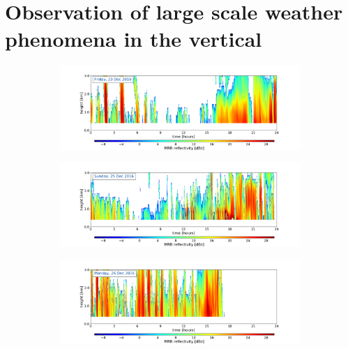 
\section{Observation of large scale weather phenomena in the vertical}
\begin{figure}[h!]
	\centering
    \begin{subfigure}[t]{\textwidth}
    \centering
    	\includegraphics[trim={4.cm 2.5cm 4.5cm 1.5cm},clip,width=\textwidth]{./fig_MRR_refl/MRR_20161223}
		\caption{}\label{fig:ret:refl23}
    \end{subfigure}
    \begin{subfigure}[t]{\textwidth}
    \centering
    	\includegraphics[trim={4.cm 2.5cm 4.5cm 1.5cm},clip,width=\textwidth]{./fig_MRR_refl/MRR_20161225}
		\caption{}\label{fig:ret:refl25}
    \end{subfigure}
    \begin{subfigure}[t]{\textwidth}
    \centering
    	\includegraphics[trim={4.cm 2.5cm 4.5cm 1.5cm},clip,width=\textwidth]{./fig_MRR_refl/MRR_20161226}

\end{subfigure}
\end{figure}
